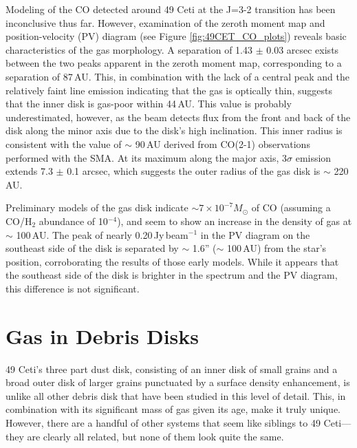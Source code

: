 Modeling of the CO detected around 49 Ceti at the J=3-2 transition has been inconclusive thus far. However, examination of the zeroth moment map and position-velocity (PV) diagram (see Figure \ref{fig:49CET_CO_plots}) reveals basic characteristics of the gas morphology. A separation of 1.43 $\pm$ 0.03 arcsec exists between the two peaks apparent in the zeroth moment map, corresponding to a separation of 87\,AU. This, in combination with the lack of a central peak and the relatively faint line emission indicating that the gas is optically thin, suggests that the inner disk is gas-poor within 44\,AU. This value is probably underestimated, however, as the beam detects flux from the front and back of the disk along the minor axis due to the disk's high inclination. This inner radius is consistent with the value of $\sim$ 90\,AU derived from CO(2-1) observations performed \cite{Hugh08} with the SMA. At its maximum along the major axis, 3$\sigma$ emission extends 7.3 $\pm$ 0.1 arcsec, which suggests the outer radius of the gas disk is $\sim$ 220\,AU. 

Preliminary models of the gas disk indicate $\sim 7 \times 10^{-7} M_{\odot}$ of CO (assuming a CO/H$_{2}$ abundance of 10$^{-4}$), and seem to show an increase in the density of gas at $\sim$ 100\,AU. The peak of nearly 0.20\,Jy\,beam$^{-1}$ in the PV diagram on the southeast side of the disk is separated by $\sim$ 1.6'' ($\sim$ 100\,AU) from the star's position, corroborating the results of those early models. While it appears that the southeast side of the disk is brighter in the spectrum and the PV diagram, this difference is not significant. 

\section{Gas in Debris Disks}

49 Ceti's three part dust disk, consisting of an inner disk of small grains and a broad outer disk of larger grains punctuated by a surface density enhancement, is unlike all other debris disk that have been studied in this level of detail. This, in combination with its significant mass of gas given its age, make it truly unique. However, there are a handful of other systems that seem like siblings to 49 Ceti---they are clearly all related, but none of them look quite the same. 

